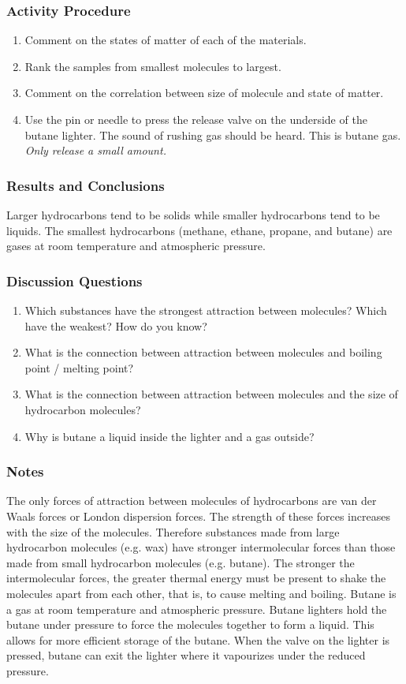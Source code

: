 \subsubsection*{Activity Procedure}
\begin{enumerate}
\item{Comment on the states of matter of each of the materials.}
\item{Rank the samples from smallest molecules to largest.}
\item{Comment on the correlation between size of molecule and state of matter.}
\item{Use the pin or needle to press the release valve on the underside of the butane lighter. The sound of rushing gas should be heard. This is butane gas. \textit{Only release a small amount.}}
\end{enumerate}

\subsubsection*{Results and Conclusions}
Larger hydrocarbons tend to be solids while smaller hydrocarbons tend to be liquids. The smallest hydrocarbons (methane, ethane, propane, and butane) are gases at room temperature and atmospheric pressure.

\subsubsection*{Discussion Questions}
\begin{enumerate}
\item{Which substances have the strongest attraction between molecules? Which have the weakest? How do you know?}
\item{What is the connection between attraction between molecules and boiling point / melting point?}
\item{What is the connection between attraction between molecules and the size of hydrocarbon molecules?}
\item{Why is butane a liquid inside the lighter and a gas outside?}
\end{enumerate}

\subsubsection*{Notes}
The only forces of attraction between molecules of hydrocarbons are van der Waals forces or London dispersion forces. The strength of these forces increases with the size of the molecules. Therefore substances made from large hydrocarbon molecules (e.g. wax) have stronger intermolecular forces than those made from small hydrocarbon molecules (e.g. butane). The stronger the intermolecular forces, the greater thermal energy must be present to shake the molecules apart from each other, that is, to cause melting and boiling.
Butane is a gas at room temperature and atmospheric pressure. Butane lighters hold the butane under pressure to force the molecules together to form a liquid. This allows for more efficient storage of the butane. When the valve on the lighter is pressed, butane can exit the lighter where it vapourizes under the reduced pressure.

